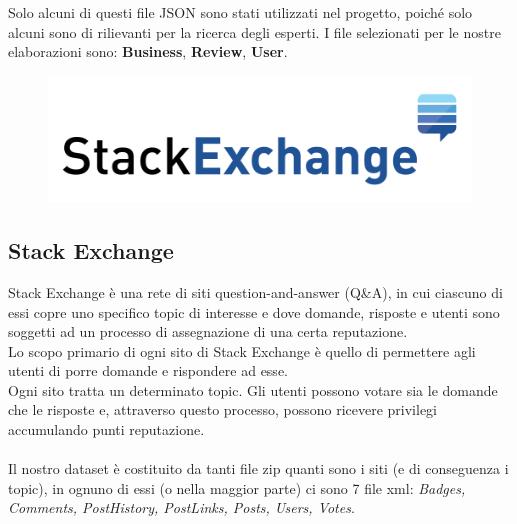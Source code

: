 Solo alcuni di questi file JSON sono stati utilizzati nel progetto, poiché solo alcuni sono di rilievanti per la ricerca degli esperti.
I file selezionati per le nostre elaborazioni sono: \textbf{Business}, \textbf{Review}, \textbf{User}.

\begin{figure}
    \centering
    \includegraphics[scale=0.15]{image/stackexchange.png}
    \label{fig:stack}
\end{figure}
\subsection{Stack Exchange}
Stack Exchange è una rete di siti question-and-answer (Q\&A), in cui ciascuno di essi copre uno specifico topic di interesse e dove domande, risposte e utenti sono soggetti ad un processo di assegnazione di una certa reputazione.\\
Lo scopo primario di ogni sito di Stack Exchange è quello di permettere agli utenti di porre domande e rispondere ad esse.\\
Ogni sito tratta un determinato topic. Gli utenti possono votare sia le domande che le risposte e, attraverso questo processo, possono ricevere privilegi accumulando punti reputazione.\\\\
Il nostro dataset è costituito da tanti file zip quanti sono i siti (e di conseguenza i topic), in ognuno di essi (o nella maggior parte) ci sono 7 file xml: \textit{Badges, Comments, PostHistory, PostLinks, Posts, Users, Votes}.\\

